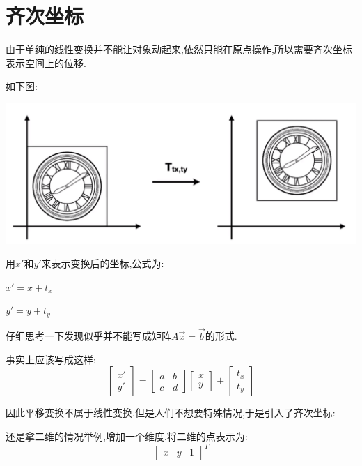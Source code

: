 {{    \section{齐次坐标}{
      由于单纯的线性变换并不能让对象动起来,依然只能在原点操作,所以需要齐次坐标表示空间上的位移.

      如下图:

      \includegraphics[scale=0.25]{resources/homogeneous_coordinates.png}

      用$x\prime$和$y\prime$来表示变换后的坐标,公式为:

      $x\prime = x + t_x$

      $y\prime = y + t_y$

      仔细思考一下发现似乎并不能写成矩阵$A\vec{x} = \vec{b}$的形式.

      事实上应该写成这样:
      $$
        \begin{bmatrix}
          x\prime \\
          y\prime
        \end{bmatrix}
        =
        \begin{bmatrix}
          a & b \\
          c & d
        \end{bmatrix}
        \begin{bmatrix}
          x \\
          y
        \end{bmatrix}
        +
        \begin{bmatrix}
          t_x \\
          t_y
        \end{bmatrix}
      $$

      因此平移变换不属于线性变换.但是人们不想要特殊情况,于是引入了齐次坐标:

      还是拿二维的情况举例,增加一个维度,将二维的点表示为:
      $$\begin{bmatrix}
          x & y & 1
        \end{bmatrix}^T$$

}}}
